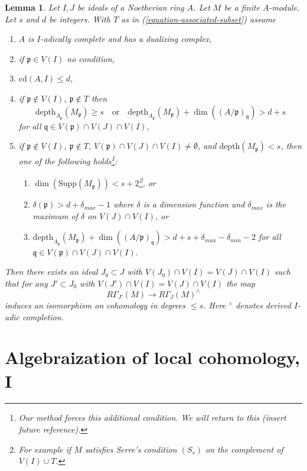 \documentclass[10pt,a4paper]{amsart}
\theoremstyle{plain}
\newtheorem{lemma}[subsection]{Lemma}
\theoremstyle{definition}
\theoremstyle{remark}
\numberwithin{equation}{subsection}
\begin{document}
\begin{lemma}
\label{lemma-algebraize-local-cohomology-general}
Let $I, J$ be ideals of a Noetherian ring $A$.
Let $M$ be a finite $A$-module.
Let $s$ and $d$ be integers. With $T$ as in
(\ref{equation-associated-subset}) assume
\begin{enumerate}
\item $A$ is $I$-adically complete and has a dualizing complex,
\item if $\mathfrak p \in V(I)$ no condition,
\item $\text{cd}(A, I) \leq d$,
\item if $\mathfrak p \not \in V(I)$, $\mathfrak p \not \in T$ then
$$
\text{depth}_{A_\mathfrak p}(M_\mathfrak p) \geq s
\quad\text{or}\quad
\text{depth}_{A_\mathfrak p}(M_\mathfrak p) +
\dim((A/\mathfrak p)_\mathfrak q) > d + s
$$
for all $\mathfrak q \in V(\mathfrak p) \cap V(J) \cap V(I)$,
\item if $\mathfrak p \not \in V(I)$, $\mathfrak p \not \in T$,
$V(\mathfrak p) \cap V(J) \cap V(I) \not = \emptyset$, and
$\text{depth}(M_\mathfrak p) < s$, then one
of the following holds\footnote{Our method
forces this additional condition. We will return to this
(insert future reference).}:
\begin{enumerate}
\item $\dim(\text{Supp}(M_\mathfrak p)) < s + 2$\footnote{For example
if $M$ satisfies Serre's condition $(S_s)$
on the complement of $V(I) \cup T$.}, or
\item  $\delta(\mathfrak p) > d + \delta_{max} - 1$
where $\delta$ is a dimension function and $\delta_{max}$
is the maximum of $\delta$ on $V(J) \cap V(I)$, or
\item $\text{depth}_{A_\mathfrak p}(M_\mathfrak p) +
\dim((A/\mathfrak p)_\mathfrak q) > d + s + \delta_{max} - \delta_{min} - 2$
for all $\mathfrak q \in V(\mathfrak p) \cap V(J) \cap V(I)$.
\end{enumerate}
\end{enumerate}
Then there exists an ideal $J_0 \subset J$ with
$V(J_0) \cap V(I) = V(J) \cap V(I)$
such that for any $J' \subset J_0$ with
$V(J') \cap V(I) = V(J) \cap V(I)$ the map
$$
R\Gamma_{J'}(M) \longrightarrow R\Gamma_J(M)^\wedge
$$
induces an isomorphism on cohomology in degrees $\leq s$.
Here ${}^\wedge$ denotes derived $I$-adic completion.
\end{lemma}

\section{Algebraization of local cohomology, I}
\label{section-algebraization-sections-general}
\end{document}
